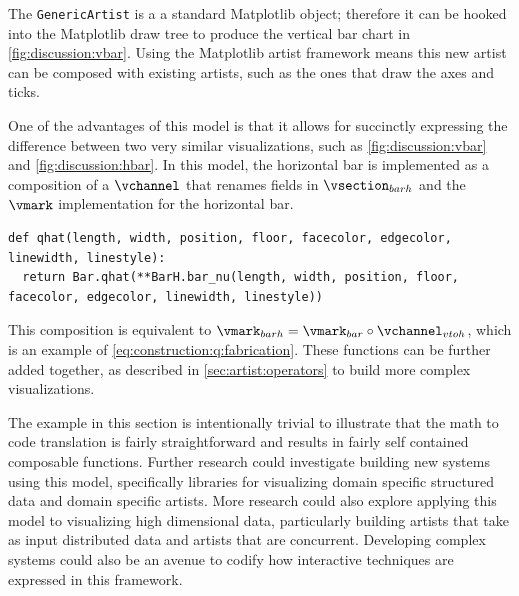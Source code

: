 \documentclass[10pt,journal,compsoc]{IEEEtran}
\theoremstyle{definition}
\theoremstyle{remark}
\begin{document}
The \texttt{GenericArtist} is a a standard Matplotlib object; therefore it can be hooked into the Matplotlib draw tree to produce the vertical bar chart in \autoref{fig:discussion:vbar}. Using the Matplotlib artist framework means this new artist can be composed with existing artists, such as the ones that draw the axes and ticks. 

One of the advantages of this model is that it allows for succinctly expressing the difference between two very similar visualizations, such as \autoref{fig:discussion:vbar} and \autoref{fig:discussion:hbar}. In this model, the horizontal bar is implemented as a composition of a $\vchannel$ that renames fields in $\vsection_{barh}$ and the $\vmark$ implementation for the horizontal bar.
\begin{verbatim}
def qhat(length, width, position, floor, facecolor, edgecolor, linewidth, linestyle):
  return Bar.qhat(**BarH.bar_nu(length, width, position, floor, facecolor, edgecolor, linewidth, linestyle))
\end{verbatim}
This composition is equivalent to $\vmark_{barh} = \vmark_{bar} \circ \vchannel_{vtoh}$, which is an example of \autoref{eq:construction:q:fabrication}. These functions can be further added together, as described in \autoref{sec:artist:operators} to build more complex visualizations. 

The example in this section is intentionally trivial to illustrate that the math to code translation is fairly straightforward and results in fairly self contained composable functions. Further research could investigate building new systems using this model, specifically libraries for visualizing domain specific structured data and domain specific artists. More research could also explore applying this model to visualizing high dimensional data, particularly building artists that take as input distributed data and artists that are concurrent. Developing complex systems could also be an avenue to codify how interactive techniques are expressed in this framework.
\end{document}
